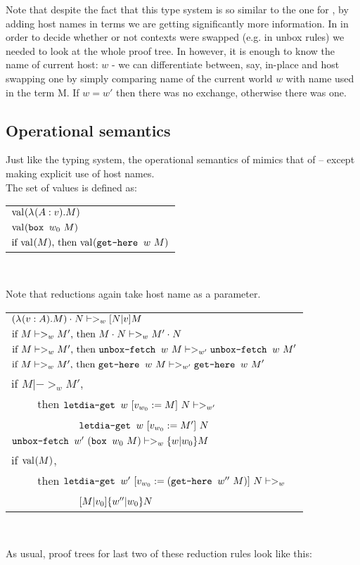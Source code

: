 Note that despite the fact that this type system is so similar to the one for \langLF{}, by adding host names in terms we are getting significantly more information. In \langLF{} in order to decide whether or not contexts were swapped (e.g. in unbox rules) we needed to look at the whole proof tree. In \langHyb{} however, it is enough to know the name of current host: $w$ - we can differentiate between, say, in-place \unboxfetche{} and host swapping one by simply comparing name of the current world $w$ with name used in the term  M. If $ w = w'$ then there was no exchange, otherwise there was one.

\subsection{Operational semantics}
Just like the typing system, the operational semantics of \langHyb{} mimics that of \langLF{} -- except making explicit use of host names.\\

The set of values is defined as:\\

\begin{spacing}{1.5}
\begin{tabular}{ l }
$\mbox{$\mathrm{val}_{}{(\mbox{$\lambda_{} (A: v). M$})}$}$\\
$\mbox{$\mathrm{val}_{}{(\mbox{$\operatorname{\texttt{box}}_{}\ {w_0}\ {M}$})}$}$\\
$\mbox{\text{if}\ $\mbox{$\mathrm{val}_{}{(M)}$}$,\ \text{then}\ $\mbox{$\mathrm{val}_{}{(\mbox{$\operatorname{\texttt{get-here}}_{}\ {w}\ {M}$})}$}$}$
\end{tabular}\\
\end{spacing}

Note that reductions again take host name as a parameter. \\

\begin{spacing}{1.5}
\begin{tabular}{ l }
$\mbox{$(\mbox{$\lambda_{} (v: A). M$}) \cdot_{} N$} |->_w \mbox{$ [N | v] M$}$\\
$ \mbox{\text{if}\ $M |->_w M'$,\ \text{then}\ $\mbox{$M \cdot_{} N$} |->_w \mbox{$M' \cdot_{} N$}$}$\\[0.5cm]

$\mbox{\text{if}\ $M|->_w M'$,\ \text{then}\ $\mbox{$\operatorname{\texttt{unbox-fetch}}_{}\ {w}\ {M}$} |->_{w'} \mbox{$\operatorname{\texttt{unbox-fetch}}_{}\ {w}\ {M}$}'$}$\\
$\mbox{\text{if}\ $M|->_w M'$,\ \text{then}\ $\mbox{$\operatorname{\texttt{get-here}}_{}\ {w}\ {M}$} |->_{w'} \mbox{$\operatorname{\texttt{get-here}}_{}\ {w}\ {M}$}'$}$\\
if ${M|->_w M'}$, \\[-0.2cm]
~~~~ then $\mbox{$\operatorname{\texttt{letdia-get}}_{}\ {w}\ {[{v}_{w_0} := M]}\ {N}$} |->_{w'}$ \\[-0.2cm]
~~~~~~~~~~~~$\mbox{$\operatorname{\texttt{letdia-get}}_{}\ {w}\ {[{v}_{w_0} := M']}\ {N}$}$ \\[0.5cm]
$\mbox{$\operatorname{\texttt{unbox-fetch}}_{}\ {w'}\ {(}$}\mbox{$\operatorname{\texttt{box}}_{}\ {w_0}\ {M}$}) |->_w \mbox{$ \{w | w_0 \} M$}$\\
if ${\mbox{$\mathrm{val}_{}{(M)}$}}$, \\[-0.2cm]
~~~~ then ${\mbox{$\operatorname{\texttt{letdia-get}}_{}\ {w'}\ {[{v}_{w_0} := (\mbox{$\operatorname{\texttt{get-here}}_{}\ {w''}\ {M}$})]}\ {N}$} |->_w}$\\[-0.2cm]
~~~~~~~~~~~~${ \mbox{$ [M | v_0] \mbox{$ \{w'' | w_0 \} N$}$}}$
\end{tabular}\\
\end{spacing}
As usual, proof trees for last two of these reduction rules look like this:

